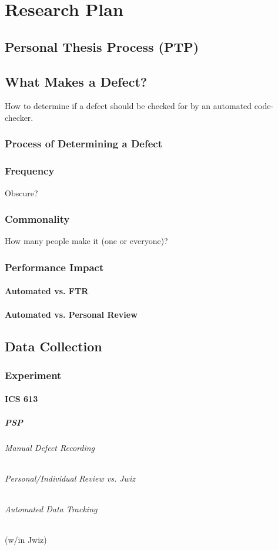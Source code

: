 \chapter{Research Plan}
\section{Personal Thesis Process (PTP)}
\section{What Makes a Defect?} 
How to determine if a defect should be checked for by an automated
code-checker.
\subsection{Process of Determining a Defect}
\subsection{Frequency}   Obscure?
\subsection{Commonality} How many people make it (one or everyone)?
\subsection{Performance Impact}
\subsubsection{Automated vs. FTR}
\subsubsection{Automated vs. Personal Review}

\section{Data Collection}
\subsection{Experiment}
\subsubsection{ICS 613}
\paragraph{PSP}
\subparagraph{Manual Defect Recording} \subparagraph{Personal/Individual
  Review vs. Jwiz} \subparagraph{Automated Data Tracking} (w/in Jwiz)
